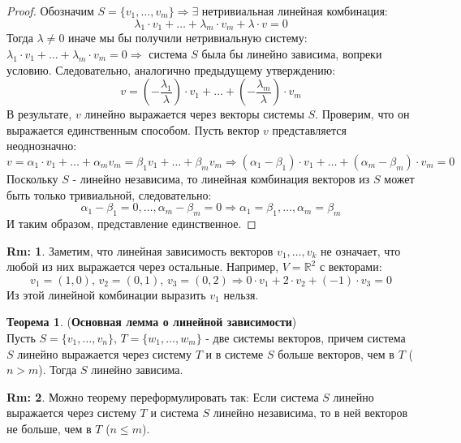 \documentclass[12pt]{article}
\newcommand{\MR}{\mathbb{R}}
\theoremstyle{definition}
\newtheorem{rem}{Rm:}
\newtheorem{theorem}{Теорема}
\begin{document}
\begin{proof}
	Обозначим $S = \{v_1, \dotsc, v_m\} \Rightarrow \exists$ нетривиальная линейная комбинация:
	$$
		\lambda_1{\cdot} v_1 + \dotsc + \lambda_m{\cdot} v_m + \lambda{\cdot}v = 0
	$$
	Тогда $\lambda \neq 0$ иначе мы бы получили нетривиальную систему: $\lambda_1{\cdot} v_1 + \dotsc + \lambda_m{\cdot} v_m = 0 \Rightarrow$ система $S$ была бы линейно зависима, вопреки условию. Следовательно, аналогично предыдущему утверждению:
	$$
		v = \left(-\dfrac{\lambda_1}{\lambda}\right){\cdot}v_1 + \dotsc  + \left(-\dfrac{\lambda_m}{\lambda}\right){\cdot}v_m
	$$
	В результате, $v$ линейно выражается через векторы системы $S$. Проверим, что он выражается единственным способом. Пусть вектор $v$ представляется неоднозначно:
	$$
		v = \alpha_1 {\cdot}v_1 + \dotsc + \alpha_m v_m = \beta_1 v_1 + \dotsc + \beta_m v_m \Rightarrow (\alpha_1 - \beta_1){\cdot}v_1 + \dotsc + (\alpha_m- \beta_m){\cdot}v_m = 0
	$$
	Поскольку $S$ - линейно независима, то линейная комбинация векторов из $S$ может быть только тривиальной, следовательно:
	$$
		\alpha_1 - \beta_1 = 0, \dotsc, \alpha_m - \beta_m = 0 \Rightarrow \alpha_1 = \beta_1 , \dotsc, \alpha_m = \beta_m
	$$
	И таким образом, представление единственное.
\end{proof}
\newpage
\begin{rem}
	Заметим, что линейная зависимость векторов $v_1,\dotsc, v_k$ не означает, что любой из них выражается через остальные. Например, $V = \MR^2$ с векторами:
	$$
		v_1 = (1,0), \, v_2 = (0,1),\, v_3 = (0,2) \Rightarrow 0{\cdot}v_1 + 2{\cdot}v_2 + (-1){\cdot}v_3 = 0
	$$
	Из этой линейной комбинации выразить $v_1$ нельзя.
\end{rem}
\begin{theorem}(\textbf{Основная лемма о линейной зависимости})\\
	Пусть $S = \{v_1,\dotsc, v_n\}, \, T = \{w_1,\dotsc, w_m\}$ - две системы векторов, причем система $S$ линейно выражается через систему $T$ и в системе $S$ больше векторов, чем в $T$ ($n > m$). Тогда $S$ линейно зависима.
\end{theorem} 
\begin{rem}
	Можно теорему переформулировать так: Если система $S$ линейно выражается через систему $T$ и система $S$ линейно независима, то в ней векторов не больше, чем в $T$ ($n\leq m$).
\end{rem}
\end{document}
